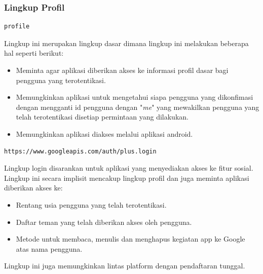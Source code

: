 \subsubsection{Lingkup Profil}
\begin{lstlisting}
profile
\end{lstlisting}
Lingkup ini merupakan lingkup dasar dimana lingkup ini melakukan beberapa hal
seperti berikut:
\begin{itemize}
\item
Meminta agar aplikasi diberikan akses ke informasi profil dasar bagi pengguna
yang terotentikasi.
\item
Memungkinkan aplikasi untuk mengetahui siapa pengguna yang dikonfimasi dengan
mengganti id pengguna dengan "{\it me}" yang mewakilkan pengguna yang telah
terotentikasi disetiap permintaan yang dilakukan.
\item
Memungkinkan aplikasi diakses melalui aplikasi android.
\end{itemize}
\begin{lstlisting}
https://www.googleapis.com/auth/plus.login
\end{lstlisting}
Lingkup login disarankan untuk aplikasi yang menyediakan akses ke fitur sosial.
Lingkup ini secara implisit mencakup lingkup profil dan juga meminta aplikasi
diberikan akses ke:
\begin{itemize}
\item
Rentang usia pengguna yang telah terotentikasi.
\item
Daftar teman yang telah diberikan akses oleh pengguna.
\item
Metode untuk membaca, menulis dan menghapus kegiatan app ke Google atas nama
pengguna.
\end{itemize}
Lingkup ini juga memungkinkan lintas platform dengan pendaftaran tunggal.


